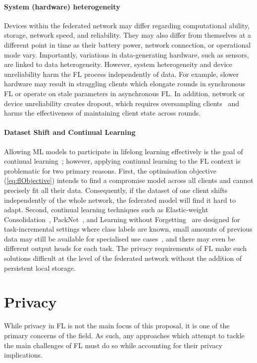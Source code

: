 \paragraph{System (hardware) heterogeneity} Devices within the federated network may differ regarding computational ability, storage, network speed, and reliability. They may also differ from themselves at a different point in time as their battery power, network connection, or operational mode vary. Importantly, variations in data-generating hardware, such as sensors, are linked to data heterogeneity. However, system heterogeneity and device unreliability harm the FL process independently of data. For example, slower hardware may result in straggling clients which elongate rounds in synchronous FL or operate on stale parameters in asynchronous FL\@. In addition, network or device unreliability creates dropout, which requires oversampling clients~\cite{ScaleSystemDesign} and harms the effectiveness of maintaining client state across rounds.

\paragraph{Dataset Shift and Continual Learning}  Allowing ML models to participate in lifelong learning effectively is the goal of continual learning~\citep{ContinualLearningSurvey}; however, applying continual learning to the FL context is problematic for two primary reasons. First, the optimisation objective (\cref{eq:flObjective}) intends to find a compromise model across all clients and cannot precisely fit all their data. Consequently, if the dataset of one client shifts independently of the whole network, the federated model will find it hard to adapt. Second, continual learning techniques such as Elastic-weight Consolidation~\citep{kirkpatrick2017overcoming},  PackNet~\citep{PackNetAM}, and Learning without Forgetting~\citep{LearningWithoutForgetting} are designed for task-incremental settings where class labels are known, small amounts of previous data may still be available for specialised use cases~\citep{kirkpatrick2017overcoming}, and there may even be different output heads for each task. The privacy requirements of FL make such solutions difficult at the level of the federated network without the addition of persistent local storage.
\section{Privacy}
While privacy in FL is not the main focus of this proposal, it is one of the primary concerns of the field. As such, any approaches which attempt to tackle the main challenges of FL must do so while accounting for their privacy implications.

